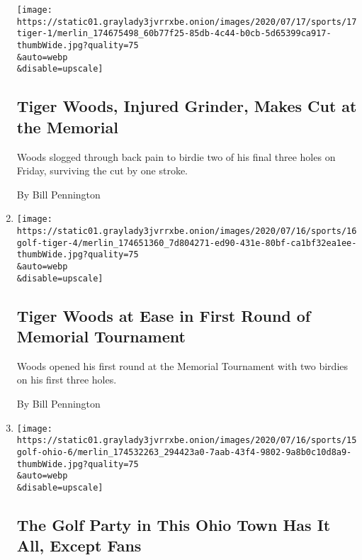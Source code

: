 \begin{enumerate}
  \texttt{[image: https://static01.graylady3jvrrxbe.onion/images/2020/07/17/sports/17tiger-1/merlin\_174675498\_60b77f25-85db-4c44-b0cb-5d65399ca917-thumbWide.jpg?quality=75\\\&auto=webp\\\&disable=upscale]}

  \hypertarget{tiger-woods-injured-grinder-makes-cut-at-the-memorial}{%
  \subsection{Tiger Woods, Injured Grinder, Makes Cut at the
  Memorial}\label{tiger-woods-injured-grinder-makes-cut-at-the-memorial}}

  Woods slogged through back pain to birdie two of his final three holes
  on Friday, surviving the cut by one stroke.

  By Bill Pennington
\item
  \href{/2020/07/16/sports/golf/tiger-woods-memorial-tournament-pga.html}{}

  \texttt{[image: https://static01.graylady3jvrrxbe.onion/images/2020/07/16/sports/16golf-tiger-4/merlin\_174651360\_7d804271-ed90-431e-80bf-ca1bf32ea1ee-thumbWide.jpg?quality=75\\\&auto=webp\\\&disable=upscale]}

  \hypertarget{tiger-woods-at-ease-in-first-round-of-memorial-tournament}{%
  \subsection{Tiger Woods at Ease in First Round of Memorial
  Tournament}\label{tiger-woods-at-ease-in-first-round-of-memorial-tournament}}

  Woods opened his first round at the Memorial Tournament with two
  birdies on his first three holes.

  By Bill Pennington
\item
  \href{/2020/07/15/sports/golf/memorial-tournament-ohio-fans.html}{}

  \texttt{[image: https://static01.graylady3jvrrxbe.onion/images/2020/07/16/sports/15golf-ohio-6/merlin\_174532263\_294423a0-7aab-43f4-9802-9a8b0c10d8a9-thumbWide.jpg?quality=75\\\&auto=webp\\\&disable=upscale]}

  \hypertarget{the-golf-party-in-this-ohio-town-has-it-all-except-fans}{%
  \subsection{The Golf Party in This Ohio Town Has It All, Except
  Fans}\label{the-golf-party-in-this-ohio-town-has-it-all-except-fans}}


\end{enumerate}
